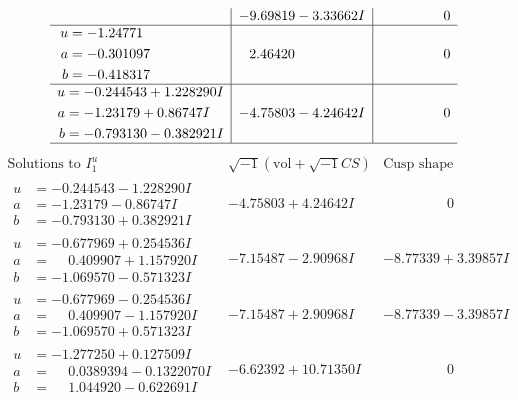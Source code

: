 \documentclass[1p]{elsarticle_modified}
\theoremstyle{definition}
\newcommand{\I}{\sqrt{-1}}
\begin{document}
$$\begin{array}{c|c|c}
 & -9.69819 - 3.33662 I & \phantom{-0.000000 } 0 \\ \hline\begin{aligned}
u &= -1.24771\phantom{ +0.000000I} \\
a &= -0.301097\phantom{ +0.000000I} \\
b &= -0.418317\phantom{ +0.000000I}\end{aligned}
 & \phantom{-}2.46420\phantom{ +0.000000I} & \phantom{-0.000000 } 0 \\ \hline\begin{aligned}
u &= -0.244543 + 1.228290 I \\
a &= -1.23179 + 0.86747 I \\
b &= -0.793130 - 0.382921 I\end{aligned}
 & -4.75803 - 4.24642 I & \phantom{-0.000000 } 0\\
 \hline 
 \end{array}$$\newpage$$\begin{array}{c|c|c}  
\text{Solutions to }I^u_{1}& \I (\text{vol} + \sqrt{-1}CS) & \text{Cusp shape}\\
 \hline 
\begin{aligned}
u &= -0.244543 - 1.228290 I \\
a &= -1.23179 - 0.86747 I \\
b &= -0.793130 + 0.382921 I\end{aligned}
 & -4.75803 + 4.24642 I & \phantom{-0.000000 } 0 \\ \hline\begin{aligned}
u &= -0.677969 + 0.254536 I \\
a &= \phantom{-}0.409907 + 1.157920 I \\
b &= -1.069570 - 0.571323 I\end{aligned}
 & -7.15487 - 2.90968 I & -8.77339 + 3.39857 I \\ \hline\begin{aligned}
u &= -0.677969 - 0.254536 I \\
a &= \phantom{-}0.409907 - 1.157920 I \\
b &= -1.069570 + 0.571323 I\end{aligned}
 & -7.15487 + 2.90968 I & -8.77339 - 3.39857 I \\ \hline\begin{aligned}
u &= -1.277250 + 0.127509 I \\
a &= \phantom{-}0.0389394 - 0.1322070 I \\
b &= \phantom{-}1.044920 - 0.622691 I\end{aligned}
 & -6.62392 + 10.71350 I & \phantom{-0.000000 } 0 \\ \hline\begin{aligned}

\end{aligned}
\end{array}$$
\end{document}
